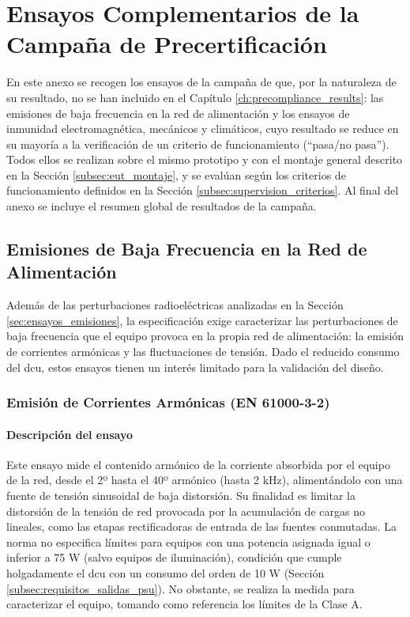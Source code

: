 \chapter{Ensayos Complementarios de la Campaña de Precertificación}
\label{anx:ensayos_complementarios}

En este anexo se recogen los ensayos de la campaña de  que, por la naturaleza de su resultado, no se han incluido en el Capítulo \ref{ch:precompliance_results}: las emisiones de baja frecuencia en la red de alimentación y los ensayos de inmunidad electromagnética, mecánicos y climáticos, cuyo resultado se reduce en su mayoría a la verificación de un criterio de funcionamiento (``pasa/no pasa''). Todos ellos se realizan sobre el mismo prototipo y con el montaje general descrito en la Sección \ref{subsec:eut_montaje}, y se evalúan según los criterios de funcionamiento definidos en la Sección \ref{subsec:supervision_criterios}. Al final del anexo se incluye el resumen global de resultados de la campaña.

\section{Emisiones de Baja Frecuencia en la Red de Alimentación}
\label{anx:emisiones_baja_frecuencia}

Además de las perturbaciones radioeléctricas analizadas en la Sección \ref{sec:ensayos_emisiones}, la especificación exige caracterizar las perturbaciones de baja frecuencia que el equipo provoca en la propia red de alimentación: la emisión de corrientes armónicas y las fluctuaciones de tensión. Dado el reducido consumo del \gls{dcu}, estos ensayos tienen un interés limitado para la validación del diseño.

\subsection{Emisión de Corrientes Armónicas (EN 61000-3-2)}
\label{subsec:emision_armonicos}

\subsubsection*{Descripción del ensayo}

Este ensayo mide el contenido armónico de la corriente absorbida por el equipo de la red, desde el 2º hasta el 40º armónico (hasta 2 kHz), alimentándolo con una fuente de tensión sinusoidal de baja distorsión. Su finalidad es limitar la distorsión de la tensión de red provocada por la acumulación de cargas no lineales, como las etapas rectificadoras de entrada de las fuentes conmutadas. La norma no especifica límites para equipos con una potencia asignada igual o inferior a 75 W (salvo equipos de iluminación), condición que cumple holgadamente el \gls{dcu} con un consumo del orden de 10 W (Sección \ref{subsec:requisitos_salidas_psu}). No obstante, se realiza la medida para caracterizar el equipo, tomando como referencia los límites de la Clase A.


